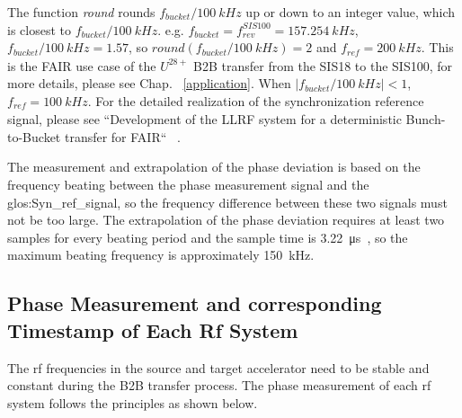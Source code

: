 The function \textit{round} rounds $f_{\mathit{bucket}}/\SI{100}{kHz}$ up or down to an integer value, which is closest to $f_{\mathit{bucket}}/\SI{100}{kHz}$. e.g. $f_{\mathit{bucket}}=f_\mathit{rev}^{SIS100}=\SI{157.254}{kHz}$, $f_{\mathit{bucket}}/\SI{100}{kHz}=1.57$, so $\textit{round} (f_{\mathit{bucket}}/\SI{100}{kHz})=2$ and $f_\mathit{ref}=\SI{200}{kHz}$. This is the FAIR use case of the $U^{28+}$ B2B transfer from the SIS18 to the SIS100, for more details, please see Chap. ~\ref{application}. When $|f_{\mathit{bucket}}/\SI{100}{kHz}|<1$, $f_\mathit{ref}=\SI{100}{kHz}$.  For the detailed realization of the synchronization reference signal, please see ``Development of the LLRF system for a deterministic Bunch-to-Bucket transfer for FAIR`` ~\cite{ferrand_development_nodate}.

The measurement and extrapolation of the phase deviation is based on the frequency beating between the phase measurement signal and the \gls{glos:Syn_ref_signal}, so the frequency difference between these two signals must not be too large. The extrapolation of the phase deviation requires at least two samples for every beating period and the sample time is \SI{3.22}{\us}~\cite{ferrand_development_nodate}, so the maximum beating frequency is approximately \SI{150}{kHz}. 

 
%
\subsection{Phase Measurement and corresponding Timestamp of Each Rf System}
The rf frequencies in the source and target accelerator need to be stable and constant during the B2B transfer process. The phase measurement of each rf system follows the principles as shown below.

